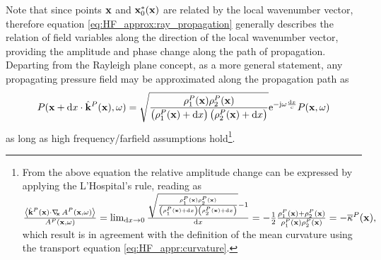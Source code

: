 Note that since points $\mathbf{x}$ and $\mathbf{x}_0^*(\mathbf{x})$ are related by the local wavenumber vector, therefore equation \eqref{eq:HF_approx:ray_propagation} generally describes the relation of field variables along the direction of the local wavenumber vector, providing the amplitude and phase change along the path of propagation.
Departing from the Rayleigh plane concept, as a more general statement, any propagating pressure field may be approximated along the propagation path as
\begin{equation}
P(\mathbf{x}+\mathrm{d} x \cdot \hat{\mathbf{k}}^P(\mathbf{x}),\omega) =
\sqrt{ \frac{ \rho_1^P(\mathbf{x}) \rho_2^P(\mathbf{x}) }{ \left(\rho_1^P(\mathbf{x}) + \mathrm{d} x \right) \left(\rho_2^P(\mathbf{x}) + \mathrm{d} x\right) } }
\mathrm{e}^{-\mathrm{j} \omega \frac{\mathrm{d} x}{c} } P(\mathbf{x},\omega)
\end{equation}
as long as high frequency/farfield assumptions hold\footnote{From the above equation the relative amplitude change can be expressed by applying the L'Hospital's rule, reading as
$
\frac{\left< \hat{\mathbf{k}}^P(\mathbf{x}) \cdot \nabla_{\!\!\mathbf{x}}\, A^P(\mathbf{x},\omega) \right>}{A^P(\mathbf{x},\omega)} = \lim_{\mathrm{d} x \rightarrow 0} 
\frac{\sqrt{ \frac{ \rho_1^P(\mathbf{x}) \rho_2^P(\mathbf{x}) }{ \left(\rho_1^P(\mathbf{x}) + \mathrm{d} x \right) \left(\rho_2^P(\mathbf{x}) + \mathrm{d} x\right) } }-1}{\mathrm{d} x}
= 
-\frac{1}{2}\frac{\rho_1^P(\mathbf{x}) + \rho_2^P(\mathbf{x})}{\rho_1^P(\mathbf{x}) \rho_2^P(\mathbf{x})} = -\overline{\kappa}^P(\mathbf{x}),
$%
which result is in agreement with the definition of the mean curvature using the transport equation \eqref{eq:HF_appr:curvature}.}.


